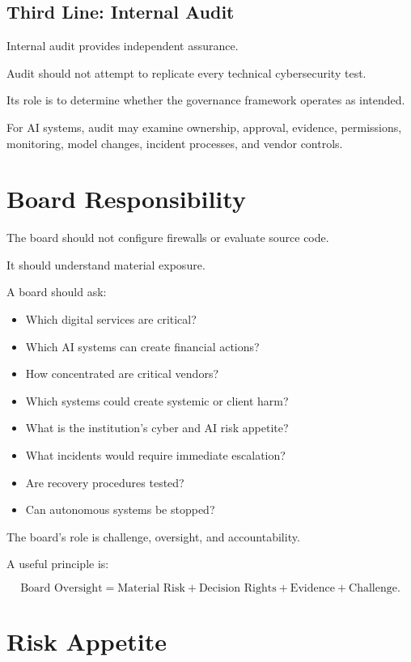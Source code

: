 \subsection{Third Line: Internal Audit}

Internal audit provides independent assurance.

Audit should not attempt to replicate every technical cybersecurity test.

Its role is to determine whether the governance framework operates as intended.

For AI systems, audit may examine ownership, approval, evidence, permissions, monitoring, model changes, incident processes, and vendor controls.

\section{Board Responsibility}

The board should not configure firewalls or evaluate source code.

It should understand material exposure.

A board should ask:

\begin{itemize}
    \item Which digital services are critical?
    \item Which AI systems can create financial actions?
    \item How concentrated are critical vendors?
    \item Which systems could create systemic or client harm?
    \item What is the institution's cyber and AI risk appetite?
    \item What incidents would require immediate escalation?
    \item Are recovery procedures tested?
    \item Can autonomous systems be stopped?
\end{itemize}

The board's role is challenge, oversight, and accountability.

A useful principle is:

\begin{equation}
\text{Board Oversight}
=
\text{Material Risk}
+
\text{Decision Rights}
+
\text{Evidence}
+
\text{Challenge}.
\end{equation}

\section{Risk Appetite}

